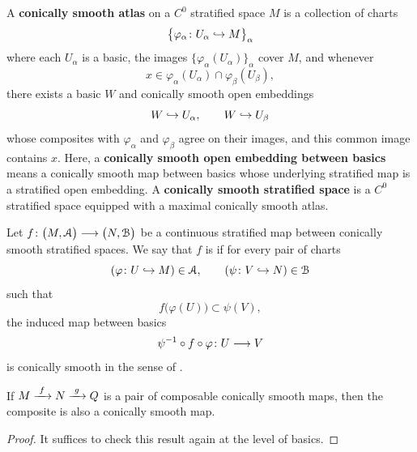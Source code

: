\begin{definition}\cite[Definition~3.2.10]{AFT1}
    A \textbf{conically smooth atlas} on a $C^0$ stratified space $M$ is a collection of charts
    \begin{equation}
        \big\{\varphi_\alpha \colon U_\alpha \hookrightarrow M\big\}_\alpha
    \end{equation}
    where each $U_\alpha$ is a basic, the images $\{\varphi_\alpha(U_\alpha)\}_\alpha$ cover $M$, and whenever
    \begin{equation}
        x \in \varphi_\alpha(U_\alpha)\cap \varphi_\beta(U_\beta),
    \end{equation}
    there exists a basic $W$ and conically smooth open embeddings
    \begin{equation}
        W \hookrightarrow U_\alpha, \qquad W \hookrightarrow U_\beta
    \end{equation}
    whose composites with $\varphi_\alpha$ and $\varphi_\beta$ agree on their images, and this common image contains $x$. Here, a \textbf{conically smooth open embedding between basics} means a conically smooth map between basics whose underlying stratified map is a stratified open embedding. A \textbf{conically smooth stratified space} is a $C^0$ stratified space equipped with a maximal conically smooth atlas.
\end{definition}

\begin{definition}
    Let $f \colon \big(M,\mathcal{A}\big) \longrightarrow \big(N,\mathcal{B}\big)$ be a continuous stratified map between conically smooth stratified spaces. We say that $f$ is  if for every pair of charts
    \begin{equation}
        (\varphi\colon U \hookrightarrow M) \in \mathcal{A}, \qquad (\psi \colon V \hookrightarrow N) \in \mathcal{B}
    \end{equation}
    such that
    \begin{equation}
       f\big(\varphi(U)\big) \subset \psi(V),
    \end{equation}
    the induced map between basics
    \begin{equation}
        \psi^{-1} \circ f \circ \varphi \colon U \longrightarrow V
    \end{equation}
    is conically smooth in the sense of .
\end{definition}

\begin{proposition}
    If $M\xrightarrow{\,\, f \,\,} N \xrightarrow{\,\, g \,\,} Q$ is a pair of composable conically smooth maps, then the composite is also a conically smooth map. 
\end{proposition}
\begin{proof}
    It suffices to check this result again at the level of basics.
\end{proof}


